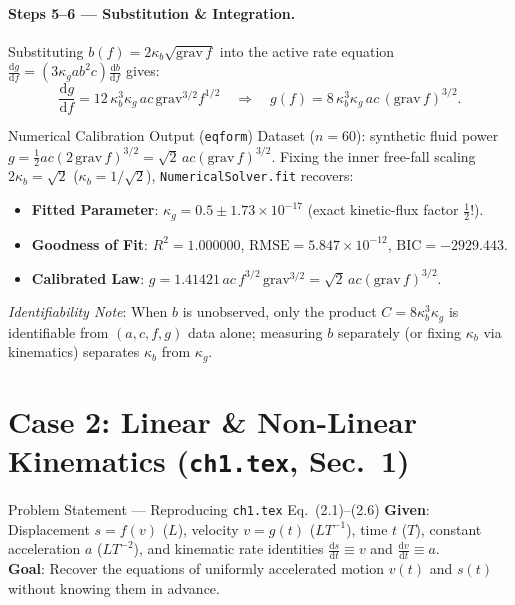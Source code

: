 \documentclass[11pt,a4paper]{article}
\newcommand{\dd}{\mathrm{d}}
\newcommand{\td}[2]{\frac{\dd #1}{\dd #2}}
\begin{document}
\paragraph{Steps 5--6 — Substitution \& Integration.}
Substituting $b(f) = 2\kappa_b\sqrt{\text{grav}\,f}$ into the active rate equation $\td{g}{f} = (3\kappa_g a b^2 c)\td{b}{f}$ gives:
\begin{equation}
  \td{g}{f} = 12\,\kappa_b^3 \kappa_g\, a c\,\text{grav}^{3/2} f^{1/2}
  \quad\Longrightarrow\quad
  g(f) = 8\,\kappa_b^3 \kappa_g\, a c\, (\text{grav}\,f)^{3/2}.
\end{equation}

\begin{resultbox}{Numerical Calibration Output (\texttt{eqform})}
Dataset ($n = 60$): synthetic fluid power $g = \tfrac{1}{2} a c (2\,\text{grav}\,f)^{3/2} = \sqrt{2}\,a c (\text{grav}\,f)^{3/2}$. Fixing the inner free-fall scaling $2\kappa_b = \sqrt{2}$ ($\kappa_b = 1/\sqrt{2}$), \texttt{NumericalSolver.fit} recovers:
\begin{itemize}[leftmargin=1.4em,itemsep=2pt]
  \item \textbf{Fitted Parameter}: $\kappa_g = 0.5 \pm 1.73 \times 10^{-17}$ (exact kinetic-flux factor $\tfrac{1}{2}$!).
  \item \textbf{Goodness of Fit}: $R^2 = 1.000000$, $\text{RMSE} = 5.847 \times 10^{-12}$, $\text{BIC} = -2929.443$.
  \item \textbf{Calibrated Law}: $g = 1.41421\, a c\, f^{3/2}\,\text{grav}^{3/2} = \sqrt{2}\, a c (\text{grav}\,f)^{3/2}$.
\end{itemize}
\emph{Identifiability Note}: When $b$ is unobserved, only the product $C = 8\kappa_b^3\kappa_g$ is identifiable from $(a, c, f, g)$ data alone; measuring $b$ separately (or fixing $\kappa_b$ via kinematics) separates $\kappa_b$ from $\kappa_g$.
\end{resultbox}

\section{Case 2: Linear \& Non-Linear Kinematics (\texttt{ch1.tex}, Sec.~1)}

\begin{setupbox}{Problem Statement — Reproducing \texttt{ch1.tex} Eq.~(2.1)--(2.6)}
\textbf{Given}: Displacement $s = f(v)$ ($L$), velocity $v = g(t)$ ($LT^{-1}$), time $t$ ($T$), constant acceleration $a$ ($LT^{-2}$), and kinematic rate identities $\td{s}{t} \equiv v$ and $\td{v}{t} \equiv a$.\\
\textbf{Goal}: Recover the equations of uniformly accelerated motion $v(t)$ and $s(t)$ without knowing them in advance.
\end{setupbox}
\end{document}
